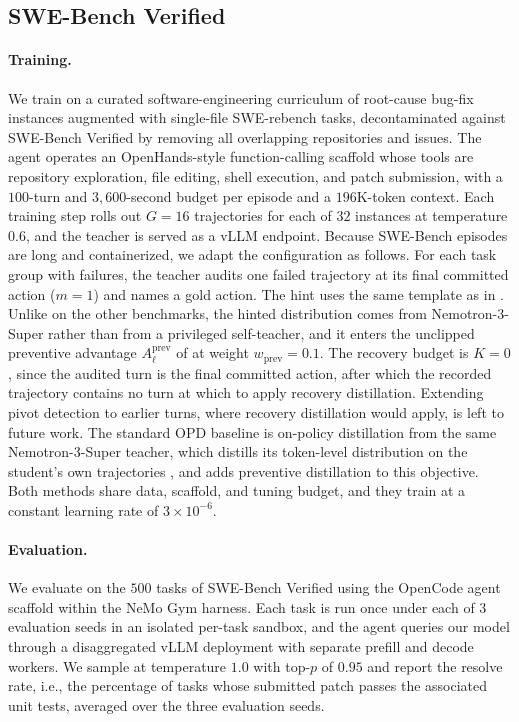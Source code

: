 \subsection{SWE-Bench Verified}
\label{app:swebench}
\paragraph{Training.} We train on a curated software-engineering curriculum of root-cause bug-fix instances augmented with single-file SWE-rebench tasks, decontaminated against SWE-Bench Verified by removing all overlapping repositories and issues. The agent operates an OpenHands-style function-calling scaffold whose tools are repository exploration, file editing, shell execution, and patch submission, with a $100$-turn and $3{,}600$-second budget per episode and a $196$K-token context. Each training step rolls out $G = 16$ trajectories for each of $32$ instances at temperature $0.6$, and the teacher is served as a vLLM endpoint. Because SWE-Bench episodes are long and containerized, we adapt the configuration as follows. For each task group with failures, the teacher audits one failed trajectory at its final committed action ($m = 1$) and names a gold action. The hint uses the same template as in . Unlike on the other benchmarks, the hinted distribution comes from Nemotron-3-Super rather than from a privileged self-teacher, and it enters the unclipped preventive advantage $A^{\mathrm{prev}}_\ell$ of  at weight $w_\text{prev} = 0.1$. The recovery budget is $K = 0$, since the audited turn is the final committed action, after which the recorded trajectory contains no turn at which to apply recovery distillation. Extending pivot detection to earlier turns, where recovery distillation would apply, is left to future work. The standard OPD baseline is on-policy distillation from the same Nemotron-3-Super teacher, which distills its token-level distribution on the student's own trajectories \citep{agarwal2024gkd}, and \method{} adds preventive distillation to this objective. Both methods share data, scaffold, and tuning budget, and they train at a constant learning rate of $3 \times 10^{-6}$.

\paragraph{Evaluation.} We evaluate on the $500$ tasks of SWE-Bench Verified using the OpenCode agent scaffold within the NeMo Gym harness. Each task is run once under each of $3$ evaluation seeds in an isolated per-task sandbox, and the agent queries our model through a disaggregated vLLM deployment with separate prefill and decode workers. We sample at temperature $1.0$ with top-$p$ of $0.95$ and report the resolve rate, i.e., the percentage of tasks whose submitted patch passes the associated unit tests, averaged over the three evaluation seeds.

